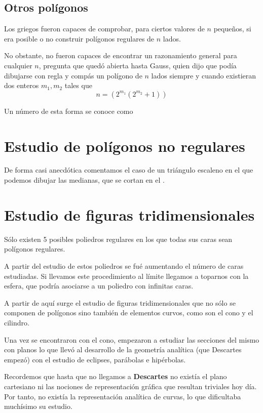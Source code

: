 \documentclass{apuntes}
\begin{document}
\subsection{Otros polígonos}

Los griegos fueron capaces de comprobar, para ciertos valores de $n$ pequeños, si era posible o no construir polígonos regulares de $n$ lados.

No obstante, no fueron capaces de encontrar un razonamiento general para cualquier $n$, pregunta que quedó abierta hasta Gauss, quien dijo que podía dibujarse con regla y compás un polígono de $n$ lados siempre y cuando existieran dos enteros $m_1,m_2$ tales que
\[n = (2^{m_1}(2^{m_2}+1))\]

Un número de esta forma se conoce como 

\section{Estudio de polígonos no regulares}

De forma casi anecdótica comentamos el caso de un triángulo escaleno en el que podemos dibujar las medianas, que se cortan en el .

\section{Estudio de figuras tridimensionales}
Sólo existen 5 posibles poliedros regulares en los que todas sus caras sean polígonos regulares.

A partir del estudio de estos poliedros se fué aumentando el número de caras estudiadas. Si llevamos este procedimiento al límite llegamos a toparnos con la esfera, que podría asociarse a un poliedro con infinitas caras.

A partir de aquí surge el estudio de figuras tridimensionales que no sólo se componen de polígonos sino también de elementos curvos, como son el cono y el cilindro.

Una vez se encontraron con el cono, empezaron a estudiar las secciones del mismo con planos lo que llevó al desarrollo de la geometría analítica (que Descartes empezó) con el estudio de eclipses, parábolas e hipérbolas.

\obs Recordemos que hasta que no llegamos a \textbf{Descartes} no existía el plano cartesiano ni las nociones de representación gráfica que resultan triviales hoy día. Por tanto, no existía la representación analítica de curvas, lo que dificultaba muchísimo su estudio.
\end{document}
